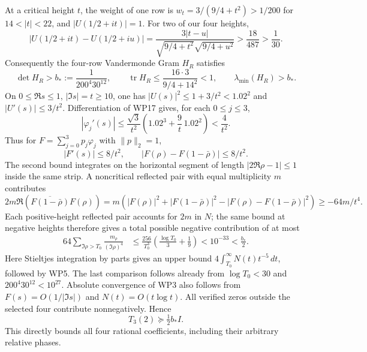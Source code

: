 \documentclass[11pt]{article}
\begin{document}
At a critical height $t$, the weight of one row is
$w_t=3/(9/4+t^2)>1/200$ for $14<|t|<22$, and $|U(1/2+it)|=1$.
For two of our four heights,
\[
 |U(1/2+it)-U(1/2+iu)|
 =\frac{3|t-u|}{\sqrt{9/4+t^2}\sqrt{9/4+u^2}}
 >\frac{18}{487}>\frac1{30}.                                \tag{WP18}
\]
Consequently the four-row Vandermonde Gram $H_R$ satisfies
\[
 \det H_R> b_*:=\frac1{200^4 30^{12}},\qquad
 \operatorname{tr}H_R\le\frac{16\cdot3}{9/4+14^2}<1,
 \qquad\lambda_{\min}(H_R)>b_*.                              \tag{WP19}
\]
On $0\le\Re s\le1$, $|\Im s|=t\ge10$, one has
$|U(s)|^2\le1+3/t^2<1.02^2$ and
$|U'(s)|\le3/t^2$. Differentiation of WP17 gives, for each
$0\le j\le3$,
\[
 |\varphi_j'(s)|
 \le\frac{\sqrt3}{t^2}
       \left(1.02^3+\frac9t\,1.02^2\right)<\frac4{t^2}.
\]
Thus for $F=\sum_{j=0}^3p_j\varphi_j$ with $\|p\|_2=1$,
\[
 |F'(s)|\le8/t^2,\qquad
 |F(\rho)-F(1-\bar\rho)|\le8/t^2.                           \tag{WP20}
\]
The second bound integrates on the horizontal segment of length
$|2\Re\rho-1|\le1$ inside the same strip. A noncritical reflected
pair with equal multiplicity $m$ contributes
\[
 2m\Re(\overline{F(1-\bar\rho)}F(\rho))
 =m\left(|F(\rho)|^2+|F(1-\bar\rho)|^2
        -|F(\rho)-F(1-\bar\rho)|^2\right)
 \ge-64m/t^4.                                                 \tag{WP21}
\]
Each positive-height reflected pair accounts for $2m$ in $N$;
the same bound at negative heights therefore gives a total
possible negative contribution of at most
\[
 \begin{split}
 64\sum_{\Im\rho>T_0}\frac{m_\rho}{(\Im\rho)^4}
 &\le\frac{256}{T_0^3}
                    \left(\frac{\log T_0}{3}+\frac19\right)
 <10^{-33}<\frac{b_*}{2}.
 \end{split}                                                   \tag{WP22}
\]
Here Stieltjes integration by parts gives an upper bound
$4\int_{T_0}^\infty N(t)t^{-5}\,dt$, followed by WP5. The last
comparison follows already from $\log T_0<30$ and
$200^4 30^{12}<10^{27}$. Absolute convergence of WP3 also follows
from $F(s)=O(1/|\Im s|)$ and $N(t)=O(t\log t)$.
All verified zeros outside the selected four contribute
nonnegatively. Hence
\[
                      \boxed{T_3(2)\succeq\tfrac12 b_* I.}    \tag{WP23}
\]
This directly bounds all four rational coefficients, including
their arbitrary relative phases.
\end{document}
